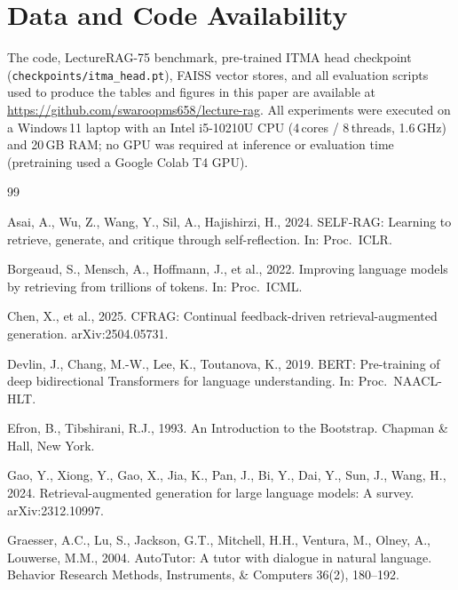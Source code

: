 \documentclass[preprint,12pt]{elsarticle}
\begin{document}
\section*{Data and Code Availability}
The code, LectureRAG-75 benchmark, pre-trained ITMA head checkpoint
(\texttt{checkpoints/itma\_head.pt}), FAISS vector stores, and all evaluation
scripts used to produce the tables and figures in this paper are available at
\url{https://github.com/swaroopms658/lecture-rag}.  All experiments were
executed on a Windows\,11 laptop with an Intel i5-10210U CPU (4\,cores /
8\,threads, 1.6\,GHz) and 20\,GB RAM; no GPU was required at inference or
evaluation time (pretraining used a Google Colab T4 GPU).


\begin{thebibliography}{99}

Asai, A., Wu, Z., Wang, Y., Sil, A., Hajishirzi, H., 2024.
SELF-RAG: Learning to retrieve, generate, and critique through
self-reflection. In: Proc.\ ICLR.

Borgeaud, S., Mensch, A., Hoffmann, J., et al., 2022.
Improving language models by retrieving from trillions of tokens.
In: Proc.\ ICML.

Chen, X., et al., 2025. CFRAG: Continual feedback-driven retrieval-augmented
generation. arXiv:2504.05731.

Devlin, J., Chang, M.-W., Lee, K., Toutanova, K., 2019.
BERT: Pre-training of deep bidirectional Transformers for language
understanding. In: Proc.\ NAACL-HLT.

Efron, B., Tibshirani, R.J., 1993.
An Introduction to the Bootstrap. Chapman \& Hall, New York.

Gao, Y., Xiong, Y., Gao, X., Jia, K., Pan, J., Bi, Y., Dai, Y., Sun, J.,
Wang, H., 2024.
Retrieval-augmented generation for large language models: A survey.
arXiv:2312.10997.

Graesser, A.C., Lu, S., Jackson, G.T., Mitchell, H.H., Ventura, M.,
Olney, A., Louwerse, M.M., 2004.
AutoTutor: A tutor with dialogue in natural language.
Behavior Research Methods, Instruments, \& Computers 36(2), 180--192.


\end{thebibliography}
\end{document}
